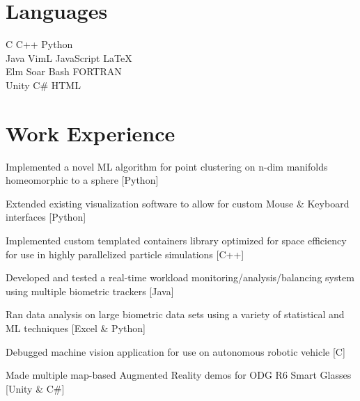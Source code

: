 \documentclass[letterpaper]{headers} %
\begin{document}
\begin{minipage}[t]{0.33\textwidth}
\section{Languages}
	C \textbullet{} C++ \textbullet{} Python \\
	Java \textbullet{} VimL \textbullet{} JavaScript \textbullet{} \LaTeX\ \\
	Elm \textbullet{} Soar \textbullet{} Bash \textbullet{} FORTRAN \textbullet{} \\
	Unity \textbullet{} C\# \textbullet{} HTML\\
\sectionspace
\end{minipage}
\hfill
%
\begin{minipage}[t]{0.66\textwidth}

\section{Work Experience}
	\vspace{\topsep}
	\begin{tightitemize}
		\item Implemented a novel ML algorithm for point clustering on n-dim manifolds homeomorphic to a sphere [Python]
		\item Extended existing visualization software to allow for custom Mouse \& Keyboard interfaces [Python]
		\item Implemented custom templated containers library optimized for space efficiency for use in highly parallelized particle simulations [C++]
	\end{tightitemize}

	\sectionspace

	\begin{tightitemize}
		\item Developed and tested a real-time workload monitoring/analysis/balancing system using multiple biometric trackers [Java]
		\item Ran data analysis on large biometric data sets using a variety of statistical and ML techniques [Excel \& Python]
		\item Debugged machine vision application for use on autonomous robotic vehicle [C]
		\item Made multiple map-based Augmented Reality demos for ODG R6 Smart Glasses [Unity \& C\#]
	\end{tightitemize}
	

\end{minipage}
\end{document}
